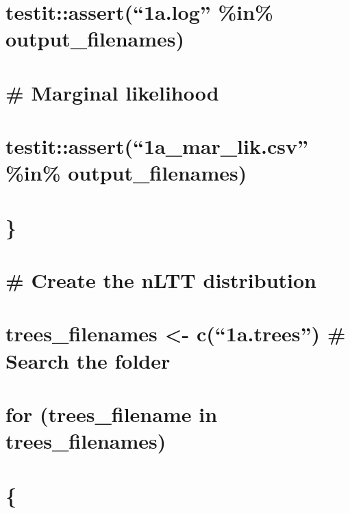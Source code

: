 \documentclass[]{article}
\begin{document}
\section{\texorpdfstring{testit::assert(``1a.log'' \%in\%
output\_filenames)}{testit::assert(1a.log \%in\% output\_filenames)}}\label{testitassert1a.log-in-output_filenames}

\section{\# Marginal likelihood}\label{marginal-likelihood}

\section{\texorpdfstring{testit::assert(``1a\_mar\_lik.csv'' \%in\%
output\_filenames)}{testit::assert(1a\_mar\_lik.csv \%in\% output\_filenames)}}\label{testitassert1a_mar_lik.csv-in-output_filenames}

\section{\}}\label{section-4}

\section{}\label{section-5}

\section{\# Create the nLTT
distribution}\label{create-the-nltt-distribution}

\section{\texorpdfstring{trees\_filenames \textless{}- c(``1a.trees'')
\# Search the
folder}{trees\_filenames \textless{}- c(1a.trees) \# Search the folder}}\label{trees_filenames---c1a.trees-search-the-folder}

\section{for (trees\_filename in
trees\_filenames)}\label{for-trees_filename-in-trees_filenames}

\section{\{}\label{section-6}
\end{document}

